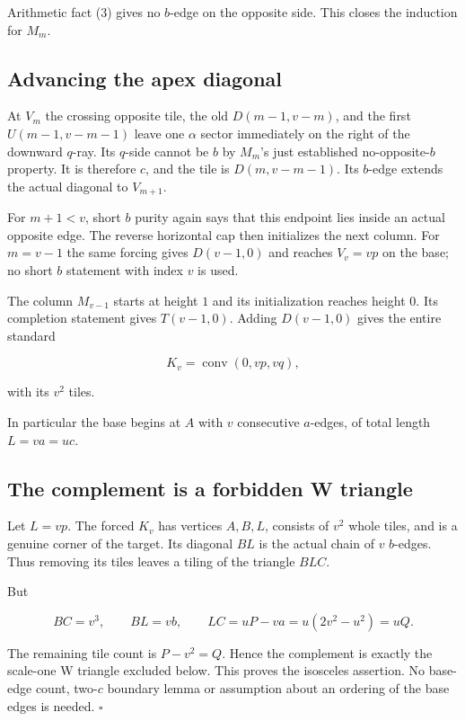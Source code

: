 \documentclass[
  11pt,
  a4paper,
]{article}
\begin{document}
Arithmetic fact (3) gives no \(b\)-edge on the opposite side. This
closes the induction for \(M_m\).

\hypertarget{advancing-the-apex-diagonal}{%
\subsection{Advancing the apex
diagonal}\label{advancing-the-apex-diagonal}}

At \(V_m\) the crossing opposite tile, the old \(D(m-1,v-m)\), and the
first \(U(m-1,v-m-1)\) leave one \(\alpha\) sector immediately on the
right of the downward \(q\)-ray. Its \(q\)-side cannot be \(b\) by
\(M_m\)'s just established no-opposite-\(b\) property. It is therefore
\(c\), and the tile is \(D(m,v-m-1)\). Its \(b\)-edge extends the actual
diagonal to \(V_{m+1}\).

For \(m+1<v\), short \(b\) purity again says that this endpoint lies
inside an actual opposite edge. The reverse horizontal cap then
initializes the next column. For \(m=v-1\) the same forcing gives
\(D(v-1,0)\) and reaches \(V_v=vp\) on the base; no short \(b\)
statement with index \(v\) is used.

The column \(M_{v-1}\) starts at height \(1\) and its initialization
reaches height \(0\). Its completion statement gives \(T(v-1,0)\).
Adding \(D(v-1,0)\) gives the entire standard

\[
K_v=\operatorname{conv}(0,vp,vq),
\]

with its \(v^2\) tiles.

In particular the base begins at \(A\) with \(v\) consecutive
\(a\)-edges, of total length \(L=va=uc\).

\hypertarget{the-complement-is-a-forbidden-w-triangle}{%
\subsection{The complement is a forbidden W
triangle}\label{the-complement-is-a-forbidden-w-triangle}}

Let \(L=vp\). The forced \(K_v\) has vertices \(A,B,L\), consists of
\(v^2\) whole tiles, and is a genuine corner of the target. Its diagonal
\(BL\) is the actual chain of \(v\) \(b\)-edges. Thus removing its tiles
leaves a tiling of the triangle \(BLC\).

But

\[
BC=v^3,\qquad BL=vb,\qquad
LC=uP-va=u(2v^2-u^2)=uQ.
\]

The remaining tile count is \(P-v^2=Q\). Hence the complement is exactly
the scale-one W triangle excluded below. This proves the isosceles
assertion. No base-edge count, two-\(c\) boundary lemma or assumption
about an ordering of the base edges is needed. \(\square\)
\end{document}
